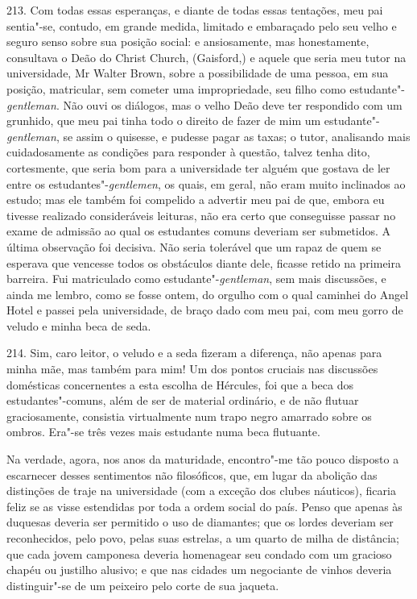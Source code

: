 213. Com todas essas esperanças, e diante de todas essas tentações, meu
pai sentia"-se, contudo, em grande medida, limitado e embaraçado pelo seu
velho e seguro senso sobre sua posição social: e ansiosamente, mas
honestamente, consultava o Deão do Christ Church, (Gaisford,) e aquele
que seria meu tutor na universidade, Mr Walter Brown, sobre a
possibilidade de uma pessoa, em sua posição, matricular, sem cometer uma
impropriedade, seu filho como estudante"-\emph{gentleman}. Não ouvi os
diálogos, mas o velho Deão deve ter respondido com um grunhido, que meu
pai tinha todo o direito de fazer de mim um estudante"-\emph{gentleman},
se assim o quisesse, e pudesse pagar as taxas; o tutor, analisando mais
cuidadosamente as condições para responder à questão, talvez tenha dito,
cortesmente, que seria bom para a universidade ter alguém que gostava de
ler entre os estudantes"-\emph{gentlemen}, os quais, em geral, não eram
muito inclinados ao estudo; mas ele também foi compelido a advertir meu
pai de que, embora eu tivesse realizado consideráveis leituras, não era
certo que conseguisse passar no exame de admissão ao qual os estudantes
comuns deveriam ser submetidos. A última observação foi decisiva. Não
seria tolerável que um rapaz de quem se esperava que vencesse todos os
obstáculos diante dele, ficasse retido na primeira barreira. Fui
matriculado como estudante"-\emph{gentleman}, sem mais discussões, e
ainda me lembro, como se fosse ontem, do orgulho com o qual caminhei do
Angel Hotel e passei pela universidade, de braço dado com meu pai, com
meu gorro de veludo e minha beca de seda.

214. Sim, caro leitor, o veludo e a seda fizeram a diferença, não apenas
para minha mãe, mas também para mim! Um dos pontos cruciais nas
discussões domésticas concernentes a esta escolha de Hércules, foi que a
beca dos estudantes"-comuns, além de ser de material ordinário, e de não
flutuar graciosamente, consistia virtualmente num trapo negro amarrado
sobre os ombros. Era"-se três vezes mais estudante numa beca flutuante.

Na verdade, agora, nos anos da maturidade, encontro"-me tão pouco
disposto a escarnecer desses sentimentos não filosóficos, que, em lugar
da abolição das distinções de traje na universidade (com a exceção dos
clubes náuticos), ficaria feliz se as visse estendidas por toda a ordem
social do país. Penso que apenas às duquesas deveria ser permitido o uso
de diamantes; que os lordes deveriam ser reconhecidos, pelo povo, pelas
suas estrelas, a um quarto de milha de distância; que cada jovem
camponesa deveria homenagear seu condado com um gracioso chapéu ou
justilho alusivo; e que nas cidades um negociante de vinhos deveria
distinguir"-se de um peixeiro pelo corte de sua jaqueta.

